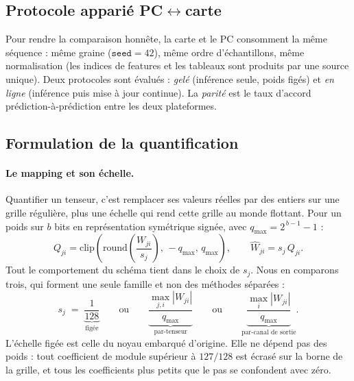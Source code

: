 \subsection{Protocole apparié PC$\leftrightarrow$carte}

Pour rendre la comparaison honnête, la carte et le PC consomment la même séquence : même graine
($\texttt{seed}=42$), même ordre d'échantillons, même normalisation (les indices de features et les
tableaux sont produits par une source unique). Deux protocoles sont évalués : \emph{gelé} (inférence
seule, poids figés) et \emph{en ligne} (inférence puis mise à jour continue). La \emph{parité} est le taux
d'accord prédiction-à-prédiction entre les deux plateformes.

\subsection{Formulation de la quantification}
\label{sec:quant_formulation}

\paragraph{Le mapping et son échelle.} Quantifier un tenseur, c'est remplacer ses valeurs réelles par
des entiers sur une grille régulière, plus une échelle qui rend cette grille au monde flottant. Pour un
poids sur $b$ bits en représentation symétrique signée, avec $q_{\max} = 2^{\,b-1} - 1$ :
\begin{equation}
\label{eq:quant_map}
Q_{ji} = \mathrm{clip}\!\left( \mathrm{round}\!\left( \frac{W_{ji}}{s_j} \right),\, -q_{\max},\, q_{\max} \right),
\qquad
\widehat{W}_{ji} = s_j \, Q_{ji} .
\end{equation}
Tout le comportement du schéma tient dans le choix de $s_j$. Nous en comparons trois, qui forment une
seule famille et non des méthodes séparées :
\begin{equation}
\label{eq:scale_gran}
s_j \;=\;
\underbrace{\frac{1}{128}}_{\text{figée}}
\qquad\text{ou}\qquad
\underbrace{\frac{\max_{j,i} |W_{ji}|}{q_{\max}}}_{\text{par-tenseur}}
\qquad\text{ou}\qquad
\underbrace{\frac{\max_i |W_{ji}|}{q_{\max}}}_{\text{par-canal de sortie}} .
\end{equation}
L'échelle figée est celle du noyau embarqué d'origine. Elle ne dépend pas des poids : tout coefficient
de module supérieur à $127/128$ est écrasé sur la borne de la grille, et tous les coefficients plus
petits que le pas se confondent avec zéro.

